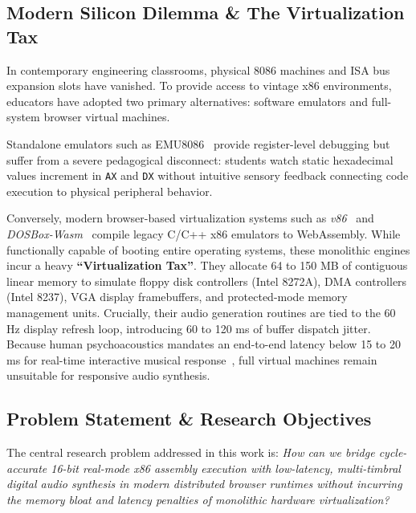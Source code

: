 \documentclass[conference]{IEEEtran}
\begin{document}
\subsection{Modern Silicon Dilemma \& The Virtualization Tax}
In contemporary engineering classrooms, physical 8086 machines and ISA bus expansion slots have vanished. To provide access to vintage x86 environments, educators have adopted two primary alternatives: software emulators and full-system browser virtual machines.

Standalone emulators such as EMU8086~\cite{emu8086} provide register-level debugging but suffer from a severe pedagogical disconnect: students watch static hexadecimal values increment in \texttt{AX} and \texttt{DX} without intuitive sensory feedback connecting code execution to physical peripheral behavior.

Conversely, modern browser-based virtualization systems such as \textit{v86}~\cite{v86} and \textit{DOSBox-Wasm}~\cite{dosbox} compile legacy C/C++ x86 emulators to WebAssembly. While functionally capable of booting entire operating systems, these monolithic engines incur a heavy \textbf{``Virtualization Tax''}. They allocate 64 to 150 MB of contiguous linear memory to simulate floppy disk controllers (Intel 8272A), DMA controllers (Intel 8237), VGA display framebuffers, and protected-mode memory management units. Crucially, their audio generation routines are tied to the 60 Hz display refresh loop, introducing 60 to 120 ms of buffer dispatch jitter. Because human psychoacoustics mandates an end-to-end latency below 15 to 20 ms for real-time interactive musical response~\cite{wilson2002}, full virtual machines remain unsuitable for responsive audio synthesis.

\subsection{Problem Statement \& Research Objectives}
The central research problem addressed in this work is: \textit{How can we bridge cycle-accurate 16-bit real-mode x86 assembly execution with low-latency, multi-timbral digital audio synthesis in modern distributed browser runtimes without incurring the memory bloat and latency penalties of monolithic hardware virtualization?}
\end{document}
